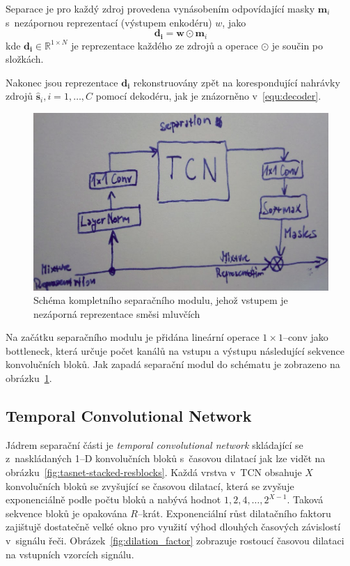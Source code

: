 Separace je pro každý zdroj provedena vynásobením odpovídající masky $\textbf{m}_i$ s~nezápornou reprezentací (výstupem enkodéru) $w$, jako
\begin{equation}
	\boldsymbol{d_i} = \boldsymbol{w} \odot \boldsymbol{m}_i
\end{equation}
kde $\boldsymbol{d_i} \in \mathbb{R}^{1 \times N}$ je reprezentace každého ze zdrojů a operace $\odot$ je součin po složkách. 

Nakonec jsou reprezentace $\boldsymbol{d_i}$ rekonstruovány zpět na korespondující nahrávky zdrojů $\boldsymbol{\hat{s}}_i, i = 1, \dots, C$ pomocí dekodéru, jak je znázorněno v~\ref{equ:decoder}.


\begin{figure}[H]
    \centering
    \includegraphics[scale=0.35]{obrazky-figures/separation_module_scheme.png}
    \caption{\label{fig:tasnet-autoenkoder}Schéma kompletního separačního modulu, jehož vstupem je nezáporná reprezentace směsi mluvčích}
\end{figure}


Na začátku separačního modulu je přidána lineární operace $1 \times 1$--conv jako bottleneck, která určuje počet kanálů na vstupu a výstupu následující sekvence konvolučních bloků. Jak zapadá separační modul do schématu je zobrazeno na obrázku~\ref{fig:tasnet-autoenkoder}.

\subsection{Temporal Convolutional Network}
Jádrem separační části je \textit{temporal convolutional network} skládající se z~naskládaných  1--D konvolučních bloků s~časovou dilatací jak lze vidět na obrázku~\ref{fig:tasnet-stacked-resblocks}. Každá vrstva v~TCN obsahuje $X$ konvolučních bloků se zvyšující se časovou dilatací, která se zvyšuje exponenciálně podle počtu bloků a nabývá hodnot $1, 2, 4, \dots, 2^{X-1}$. Taková sekvence bloků je opakována $R$--krát. Exponenciální růst dilatačního faktoru zajištujě dostatečně velké okno pro využití výhod dlouhých časových závislostí v~signálu řeči. Obrázek~\ref{fig:dilation_factor} zobrazuje rostoucí časovou dilataci na vstupních vzorcích signálu.


